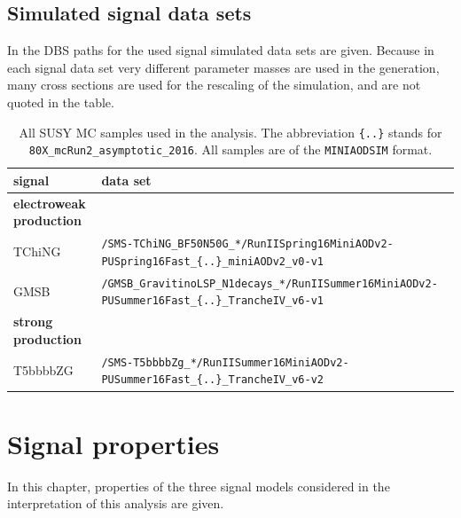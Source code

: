 \section*{Simulated signal data sets}
In  the DBS paths for the used signal simulated data sets are given. Because in each signal data set very different parameter masses are used in the generation, many cross sections are used for the rescaling of the simulation, and are not quoted in the table.

\begin{table}[tb]
 \centering
 \caption{All SUSY MC samples used in the analysis. The abbreviation \texttt{\{..\}} stands for \texttt{80X\_mcRun2\_asymptotic\_2016}. All samples are of the \texttt{MINIAODSIM} format.}
 \scriptsize
 \label{tab:app_signalsets}
 \begin{tabular}[width=\textwidth]{ll}
  \hline
  \normalsize{signal}             & \normalsize{data set}   \\\hline
  \textbf{electroweak production} &                         \\
  TChiNG                          & \verb|/SMS-TChiNG_BF50N50G_*/RunIISpring16MiniAODv2-PUSpring16Fast_{..}_miniAODv2_v0-v1| \\
  GMSB                            & \verb|/GMSB_GravitinoLSP_N1decays_*/RunIISummer16MiniAODv2-PUSummer16Fast_{..}_TrancheIV_v6-v1| \\
  \textbf{strong production}      &                         \\
  T5bbbbZG                        & \verb|/SMS-T5bbbbZg_*/RunIISummer16MiniAODv2-PUSummer16Fast_{..}_TrancheIV_v6-v2| \\
  \hline
 \end{tabular}
\end{table}

\FloatBarrier

\chapter{Signal properties}\label{sec:app_signal}
In this chapter, properties of the three signal models considered in the interpretation of this analysis are given.
